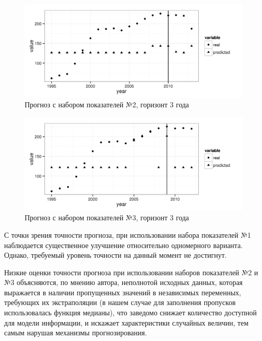 \begin{figure}[bhtp]
    \includegraphics{images/m_plot2.png}
    \caption{Прогноз с набором показателей №2, горизонт 3 года}		
    \label{figure:m_plot2}
\end{figure}

\begin{figure}[bhtp]
    \includegraphics{images/m_plot3.png}
    \caption{Прогноз с набором показателей №3, горизонт 3 года}		
    \label{figure:m_plot3}
\end{figure}

С точки зрения точности прогноза, при использовании набора показателей №1
наблюдается существенное улучшение относительно одномерного варианта.  Однако,
требуемый уровень точности на данный момент не достигнут.

Низкие оценки точности прогноза при использовании наборов показателей №2 и №3
объясняются, по мнению автора, неполнотой исходных данных, которая выражается в
наличии пропущенных значений в независимых переменных, требующих их
экстраполяции (в нашем случае для заполнения пропусков использовалась функция
медианы), что заведомо снижает количество доступной для модели информации, и
искажает характеристики случайных величин, тем самым нарушая механизмы
прогнозирования.

